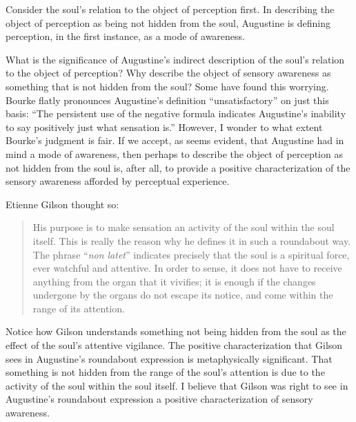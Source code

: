 \documentclass[12pt]{article}
\begin{document}
Consider the soul's relation to the object of perception first. In describing the object of perception as being not hidden from the soul, Augustine is defining perception, in the first instance, as a mode of awareness. 

What is the significance of Augustine's indirect description of the soul's relation to the object of perception? Why describe the object of sensory awareness as something that is not hidden from the soul? Some have found this worrying. Bourke flatly pronounces Augustine's definition ``unsatisfactory'' on just this basis: ``The persistent use of the negative formula indicates Augustine's inability to say positively just what sensation is.'' However, I wonder to what extent Bourke's judgment is fair. If we accept, as seems evident, that Augustine had in mind a mode of awareness, then perhaps to describe the object of perception as not hidden from the soul is, after all, to provide a positive characterization of the sensory awareness afforded by perceptual experience.

Etienne Gilson thought so:
\begin{quote}
	His purpose is to make sensation an activity of the soul within the soul itself. This is really the reason why he defines it in such a roundabout way. The phrase ``\emph{non latet}'' indicates precisely that the soul is a spiritual force, ever watchful and attentive. In order to sense, it does not have to receive anything from the organ that it vivifies; it is enough if the changes undergone by the organs do not escape its notice, and come within the range of its attention. 
\end{quote}
Notice how Gilson understands something not being hidden from the soul as the effect of the soul's attentive vigilance. The positive characterization that Gilson sees in Augustine's roundabout expression is metaphysically significant. That something is not hidden from the range of the soul's attention is due to the activity of the soul within the soul itself. I believe that Gilson was right to see in Augustine's roundabout expression a positive characterization of sensory awareness. 
\end{document}
